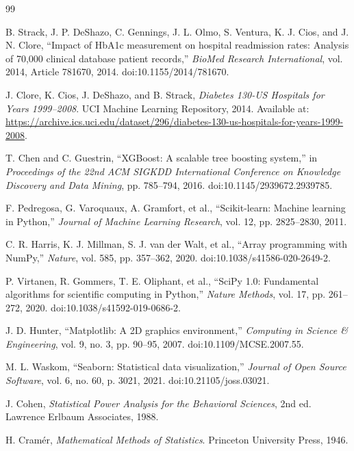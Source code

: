 \documentclass[10pt,a4paper]{article}
\begin{document}
\clearpage
\begin{thebibliography}{99}

B. Strack, J. P. DeShazo, C. Gennings, J. L. Olmo, S. Ventura, K. J. Cios, and J. N. Clore,
``Impact of HbA1c measurement on hospital readmission rates: Analysis of 70,000 clinical database patient records,''
\textit{BioMed Research International}, vol. 2014, Article 781670, 2014.
doi:10.1155/2014/781670.

J. Clore, K. Cios, J. DeShazo, and B. Strack,
\textit{Diabetes 130-US Hospitals for Years 1999--2008}.
UCI Machine Learning Repository, 2014.
Available at: \url{https://archive.ics.uci.edu/dataset/296/diabetes-130-us-hospitals-for-years-1999-2008}.

T. Chen and C. Guestrin,
``XGBoost: A scalable tree boosting system,''
in \textit{Proceedings of the 22nd ACM SIGKDD International Conference on Knowledge Discovery and Data Mining},
pp. 785--794, 2016.
doi:10.1145/2939672.2939785.

F. Pedregosa, G. Varoquaux, A. Gramfort, et al.,
``Scikit-learn: Machine learning in Python,''
\textit{Journal of Machine Learning Research}, vol. 12, pp. 2825--2830, 2011.

C. R. Harris, K. J. Millman, S. J. van der Walt, et al.,
``Array programming with NumPy,''
\textit{Nature}, vol. 585, pp. 357--362, 2020.
doi:10.1038/s41586-020-2649-2.

P. Virtanen, R. Gommers, T. E. Oliphant, et al.,
``SciPy 1.0: Fundamental algorithms for scientific computing in Python,''
\textit{Nature Methods}, vol. 17, pp. 261--272, 2020.
doi:10.1038/s41592-019-0686-2.

J. D. Hunter,
``Matplotlib: A 2D graphics environment,''
\textit{Computing in Science \& Engineering}, vol. 9, no. 3, pp. 90--95, 2007.
doi:10.1109/MCSE.2007.55.

M. L. Waskom,
``Seaborn: Statistical data visualization,''
\textit{Journal of Open Source Software}, vol. 6, no. 60, p. 3021, 2021.
doi:10.21105/joss.03021.

J. Cohen,
\textit{Statistical Power Analysis for the Behavioral Sciences}, 2nd ed.
Lawrence Erlbaum Associates, 1988.

H. Cramér,
\textit{Mathematical Methods of Statistics}.
Princeton University Press, 1946.

\end{thebibliography}
\end{document}
